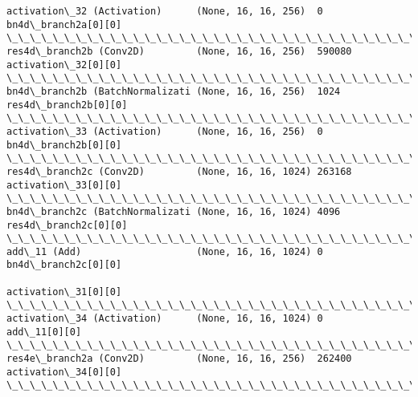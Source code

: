 \documentclass[11pt]{article}
\begin{document}
\begin{Verbatim}[commandchars=\\\{\}]
activation\_32 (Activation)      (None, 16, 16, 256)  0           bn4d\_branch2a[0][0]              
\_\_\_\_\_\_\_\_\_\_\_\_\_\_\_\_\_\_\_\_\_\_\_\_\_\_\_\_\_\_\_\_\_\_\_\_\_\_\_\_\_\_\_\_\_\_\_\_\_\_\_\_\_\_\_\_\_\_\_\_\_\_\_\_\_\_\_\_\_\_\_\_\_\_\_\_\_\_\_\_\_\_\_\_\_\_\_\_\_\_\_\_\_\_\_\_\_\_
res4d\_branch2b (Conv2D)         (None, 16, 16, 256)  590080      activation\_32[0][0]              
\_\_\_\_\_\_\_\_\_\_\_\_\_\_\_\_\_\_\_\_\_\_\_\_\_\_\_\_\_\_\_\_\_\_\_\_\_\_\_\_\_\_\_\_\_\_\_\_\_\_\_\_\_\_\_\_\_\_\_\_\_\_\_\_\_\_\_\_\_\_\_\_\_\_\_\_\_\_\_\_\_\_\_\_\_\_\_\_\_\_\_\_\_\_\_\_\_\_
bn4d\_branch2b (BatchNormalizati (None, 16, 16, 256)  1024        res4d\_branch2b[0][0]             
\_\_\_\_\_\_\_\_\_\_\_\_\_\_\_\_\_\_\_\_\_\_\_\_\_\_\_\_\_\_\_\_\_\_\_\_\_\_\_\_\_\_\_\_\_\_\_\_\_\_\_\_\_\_\_\_\_\_\_\_\_\_\_\_\_\_\_\_\_\_\_\_\_\_\_\_\_\_\_\_\_\_\_\_\_\_\_\_\_\_\_\_\_\_\_\_\_\_
activation\_33 (Activation)      (None, 16, 16, 256)  0           bn4d\_branch2b[0][0]              
\_\_\_\_\_\_\_\_\_\_\_\_\_\_\_\_\_\_\_\_\_\_\_\_\_\_\_\_\_\_\_\_\_\_\_\_\_\_\_\_\_\_\_\_\_\_\_\_\_\_\_\_\_\_\_\_\_\_\_\_\_\_\_\_\_\_\_\_\_\_\_\_\_\_\_\_\_\_\_\_\_\_\_\_\_\_\_\_\_\_\_\_\_\_\_\_\_\_
res4d\_branch2c (Conv2D)         (None, 16, 16, 1024) 263168      activation\_33[0][0]              
\_\_\_\_\_\_\_\_\_\_\_\_\_\_\_\_\_\_\_\_\_\_\_\_\_\_\_\_\_\_\_\_\_\_\_\_\_\_\_\_\_\_\_\_\_\_\_\_\_\_\_\_\_\_\_\_\_\_\_\_\_\_\_\_\_\_\_\_\_\_\_\_\_\_\_\_\_\_\_\_\_\_\_\_\_\_\_\_\_\_\_\_\_\_\_\_\_\_
bn4d\_branch2c (BatchNormalizati (None, 16, 16, 1024) 4096        res4d\_branch2c[0][0]             
\_\_\_\_\_\_\_\_\_\_\_\_\_\_\_\_\_\_\_\_\_\_\_\_\_\_\_\_\_\_\_\_\_\_\_\_\_\_\_\_\_\_\_\_\_\_\_\_\_\_\_\_\_\_\_\_\_\_\_\_\_\_\_\_\_\_\_\_\_\_\_\_\_\_\_\_\_\_\_\_\_\_\_\_\_\_\_\_\_\_\_\_\_\_\_\_\_\_
add\_11 (Add)                    (None, 16, 16, 1024) 0           bn4d\_branch2c[0][0]              
                                                                 activation\_31[0][0]              
\_\_\_\_\_\_\_\_\_\_\_\_\_\_\_\_\_\_\_\_\_\_\_\_\_\_\_\_\_\_\_\_\_\_\_\_\_\_\_\_\_\_\_\_\_\_\_\_\_\_\_\_\_\_\_\_\_\_\_\_\_\_\_\_\_\_\_\_\_\_\_\_\_\_\_\_\_\_\_\_\_\_\_\_\_\_\_\_\_\_\_\_\_\_\_\_\_\_
activation\_34 (Activation)      (None, 16, 16, 1024) 0           add\_11[0][0]                     
\_\_\_\_\_\_\_\_\_\_\_\_\_\_\_\_\_\_\_\_\_\_\_\_\_\_\_\_\_\_\_\_\_\_\_\_\_\_\_\_\_\_\_\_\_\_\_\_\_\_\_\_\_\_\_\_\_\_\_\_\_\_\_\_\_\_\_\_\_\_\_\_\_\_\_\_\_\_\_\_\_\_\_\_\_\_\_\_\_\_\_\_\_\_\_\_\_\_
res4e\_branch2a (Conv2D)         (None, 16, 16, 256)  262400      activation\_34[0][0]              
\_\_\_\_\_\_\_\_\_\_\_\_\_\_\_\_\_\_\_\_\_\_\_\_\_\_\_\_\_\_\_\_\_\_\_\_\_\_\_\_\_\_\_\_\_\_\_\_\_\_\_\_\_\_\_\_\_\_\_\_\_\_\_\_\_\_\_\_\_\_\_\_\_\_\_\_\_\_\_\_\_\_\_\_\_\_\_\_\_\_\_\_\_\_\_\_\_\_

\end{Verbatim}
\end{document}
